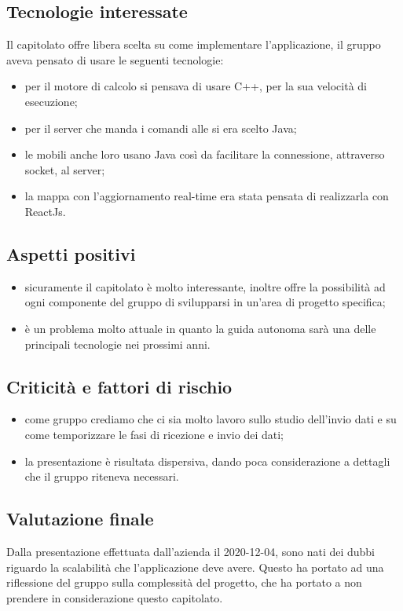 \subsection{Tecnologie interessate}
Il capitolato offre libera scelta su come implementare l'applicazione, il gruppo aveva pensato di usare le seguenti tecnologie:
\begin{itemize}
\item per il motore di calcolo si pensava di usare C++, per la sua velocità di esecuzione;
\item per il server che manda i comandi alle  si era scelto Java;
\item le  mobili anche loro usano Java così da facilitare la connessione, attraverso socket, al server;
\item la mappa con l'aggiornamento real-time era stata pensata di realizzarla con ReactJs.
\end{itemize}

\subsection{Aspetti positivi}
\begin{itemize}
\item sicuramente il capitolato è molto interessante, inoltre offre la possibilità ad ogni componente del gruppo di svilupparsi in un'area di progetto specifica;
\item è un problema molto attuale in quanto la guida autonoma sarà una delle principali tecnologie nei prossimi anni.
\end{itemize}

\subsection{Criticità e fattori di rischio}
\begin{itemize}
\item come gruppo crediamo che ci sia molto lavoro sullo studio dell'invio dati e su come temporizzare le fasi di ricezione e invio dei dati;
\item la presentazione è risultata dispersiva, dando poca considerazione a dettagli che il gruppo riteneva necessari.  
\end{itemize}

\subsection{Valutazione finale}
Dalla presentazione effettuata dall'azienda il 2020-12-04, sono nati dei dubbi riguardo la scalabilità che l'applicazione deve avere. Questo ha portato ad una riflessione del gruppo sulla complessità del progetto, che ha portato a non prendere in considerazione questo capitolato.